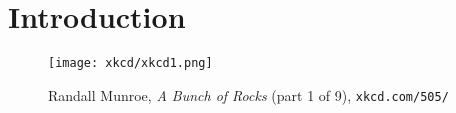 \chapter*{Introduction} 

\begin{figure}[h]
\captionsetup{labelformat=empty}
 \texttt{[image: xkcd/xkcd1.png]}
\caption*{  Randall Munroe, \emph{A Bunch of Rocks} (part 1 of 9), \texttt{xkcd.com/505/} }
\end{figure}






